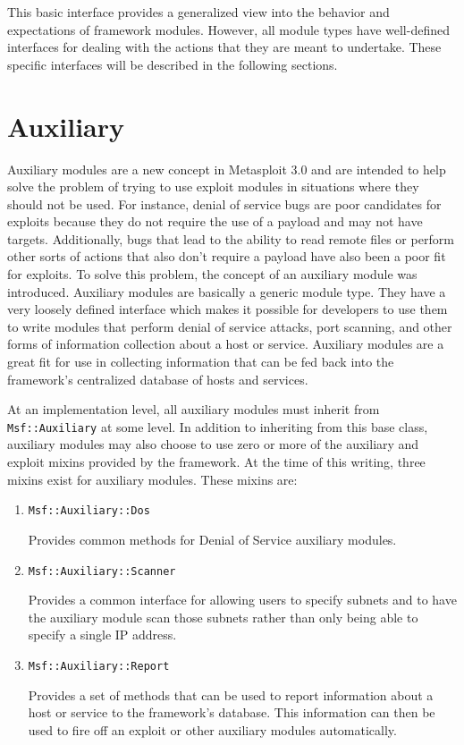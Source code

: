 \documentclass{report}
\begin{document}
\par
This basic interface provides a generalized view into the behavior
and expectations of framework modules.  However, all module types
have well-defined interfaces for dealing with the actions that they
are meant to undertake.  These specific interfaces will be described
in the following sections.

	\section{Auxiliary}

\par
Auxiliary modules are a new concept in Metasploit 3.0 and are intended to help
solve the problem of trying to use exploit modules in situations where they
should not be used.  For instance, denial of service bugs are poor candidates
for exploits because they do not require the use of a payload and may not have
targets.  Additionally, bugs that lead to the ability to read remote files or
perform other sorts of actions that also don't require a payload have also
been a poor fit for exploits.  To solve this problem, the concept of an
auxiliary module was introduced.  Auxiliary modules are basically a generic
module type.  They have a very loosely defined interface which makes it
possible for developers to use them to write modules that perform denial of
service attacks, port scanning, and other forms of information collection
about a host or service.  Auxiliary modules are a great fit for use in
collecting information that can be fed back into the framework's centralized
database of hosts and services.  

\par
At an implementation level, all auxiliary modules must inherit from
\texttt{Msf::Auxiliary} at some level.  In addition to inheriting from this
base class, auxiliary modules may also choose to use zero or more of the
auxiliary and exploit mixins provided by the framework.  At the time of this
writing, three mixins exist for auxiliary modules.  These mixins are:

\begin{enumerate}
\item \texttt{Msf::Auxiliary::Dos}

Provides common methods for Denial of Service auxiliary modules.
\item \texttt{Msf::Auxiliary::Scanner}

Provides a common interface for allowing users to specify subnets and to have
the auxiliary module scan those subnets rather than only being able to specify
a single IP address.
\item \texttt{Msf::Auxiliary::Report}

Provides a set of methods that can be used to report information about a host
or service to the framework's database.  This information can then be used to
fire off an exploit or other auxiliary modules automatically.
\end{enumerate}
\end{document}
